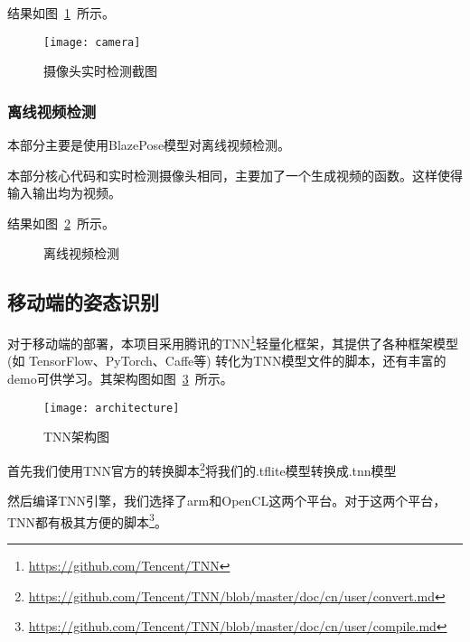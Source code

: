 结果如图~\ref{picture:19}~所示。

\begin{figure}
\centering
\texttt{[image: camera]}
\caption{摄像头实时检测截图}
\label{picture:19}
\end{figure}

\subsubsection{离线视频检测}

本部分主要是使用BlazePose模型对离线视频检测。

本部分核心代码和实时检测摄像头相同，主要加了一个生成视频的函数。这样使得输入输出均为视频。

结果如图~\ref{picture:20}~所示。

\begin{figure}[!h]
\setlength{\subfigcapskip}{-1bp}
\centering
\begin{minipage}{\textwidth}
\centering
{}
\hspace{2em}
\end{minipage}
\vspace{0.2em}
\caption{离线视频检测}
\label{picture:20}
\end{figure}


\subsection{移动端的姿态识别}

对于移动端的部署，本项目采用腾讯的TNN\footnote{\href{https://github.com/Tencent/TNN}{https://github.com/Tencent/TNN}}轻量化框架，其提供了各种框架模型 (如 TensorFlow、PyTorch、Caffe等) 转化为TNN模型文件的脚本，还有丰富的demo可供学习。其架构图如图~\ref{picture:22}~所示。

\begin{figure}
\centering
\texttt{[image: architecture]}
\caption{TNN架构图}
\label{picture:22}
\end{figure}

首先我们使用TNN官方的转换脚本\footnote{\href{https://github.com/Tencent/TNN/blob/master/doc/cn/user/convert.md}{https://github.com/Tencent/TNN/blob/master/doc/cn/user/convert.md}}将我们的.tflite模型转换成.tnn模型

然后编译TNN引擎，我们选择了arm和OpenCL这两个平台。对于这两个平台，TNN都有极其方便的脚本\footnote{\href{https://github.com/Tencent/TNN/blob/master/doc/cn/user/compile.md}{https://github.com/Tencent/TNN/blob/master/doc/cn/user/compile.md}}。

